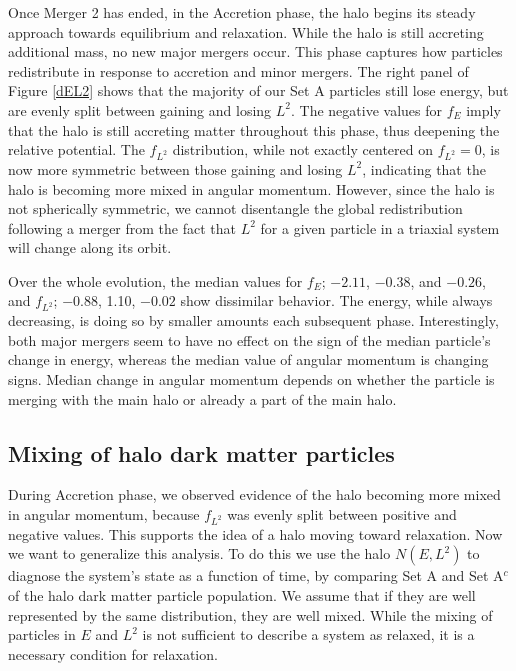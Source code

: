 \documentclass[a4paper,11pt]{article}
\begin{document}
Once Merger 2 has ended, in the Accretion phase, the halo begins its steady approach towards equilibrium and relaxation.  While the halo is still accreting additional mass, no 
new major mergers occur. This phase captures how particles redistribute in response to accretion and minor mergers.  The right panel of Figure \ref{dEL2} shows that the majority of our Set A particles still lose energy, but are evenly split between 
gaining and losing $L^2$. The negative values for $f_E$ imply that the halo is still accreting matter throughout this phase,
thus deepening the relative potential.  The $f_{L^2}$ distribution, while not exactly centered on $f_{L^2}=0$, is now more symmetric between those 
gaining and losing $L^2$, indicating that the halo is becoming more mixed in angular momentum.  However, since the halo is not spherically symmetric, we cannot 
disentangle the global redistribution following a merger from the fact that $L^2$ for a given particle in a triaxial system will change along its orbit.

Over the whole evolution, the median values for $f_E$; $-2.11$, $-0.38$, and $-0.26$, and $f_{L^2}$; $-0.88$, 1.10, $-0.02$ show dissimilar behavior.  The energy, while always 
decreasing, is doing so by smaller amounts each subsequent phase.  Interestingly, both major mergers seem to have no effect on the sign of the median particle's change in energy, 
whereas the median value of angular momentum is changing signs.  Median change in angular momentum depends on whether the particle is merging with the main halo or already a part 
of the main halo.  


\subsection{Mixing of halo dark matter particles}\label{DMmix}

During Accretion phase, we observed evidence of the halo becoming more mixed in angular momentum, because $f_{L^2}$ was evenly split between positive and negative values. 
This supports the idea of a halo moving toward relaxation.  Now we want to generalize this analysis. To do this we use the halo $N(E,L^2)$ to diagnose the 
system's state as a function of time, by comparing Set A and Set A$^c$ of the halo dark 
matter particle population.  We assume that if they are well represented by the same distribution, they are well mixed.  While the mixing of particles in $E$ and $L^2$ is 
not sufficient to describe a system as relaxed, it is a necessary condition for relaxation.  
\end{document}
